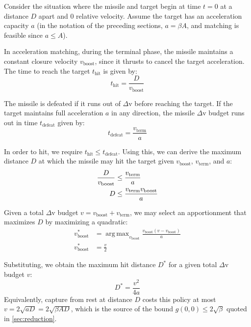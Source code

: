 \documentclass{article}
\DeclareMathOperator*{\argmax}{arg\,max}
\theoremstyle{remark}
\begin{document}
Consider the situation where the missile and target begin at time $t = 0$ at a
distance $D$ apart and 0 relative velocity. Assume the target has an
acceleration capacity $a$ (in the notation of the preceding sections, $a =
\beta A$, and matching is feasible since $a \le A$).

In acceleration matching, during the terminal phase, the missile maintains a
constant closure velocity $v_\text{boost}$, since it thrusts to cancel the
target acceleration. The time to reach the target $t_\text{hit}$ is given by:
\begin{equation}
t_\text{hit} = \frac{D}{v_\text{boost}}
\end{equation}

The missile is defeated if it runs out of $\Delta$v before reaching the target.
If the target maintains full acceleration $a$ in any direction, the missile
$\Delta$v budget runs out in time $t_\text{defeat}$ given by:
\begin{equation}
t_\text{defeat} = \frac{v_\text{term}}{a}
\end{equation}

In order to hit, we require $t_\text{hit} \le t_\text{defeat}$. Using this, we
can derive the maximum distance $D$ at which the missile may hit the target
given $v_\text{boost}$, $v_\text{term}$, and $a$:
\begin{align}
\frac{D}{v_\text{boost}} &\le \frac{v_\text{term}}{a} \\ \notag
D &\le \frac{v_\text{term} v_\text{boost}}{a}
\end{align}

Given a total $\Delta$v budget $v = v_\text{boost} + v_\text{term}$, we may
select an apportionment that maximizes $D$ by maximizing a quadratic:
\begin{align}
v_\text{boost}^* &= \argmax_{v_\text{boost}}
    \frac{v_\text{boost} (v - v_\text{boost})}{a} \\
v_\text{boost}^* &= \frac{v}{2}
\end{align}

Substituting, we obtain the maximum hit distance $D^*$ for a given total
$\Delta$v budget $v$:
\begin{equation}
  \label{eq:matching-envelope}
D^* = \frac{v^2}{4a}
\end{equation}
Equivalently, capture from rest at distance $D$ costs this policy at most $v =
2\sqrt{aD} = 2\sqrt{\beta A D}$, which is the source of the bound $g(0,0) \le
2\sqrt\beta$ quoted in \cref{sec:reduction}.
\end{document}
